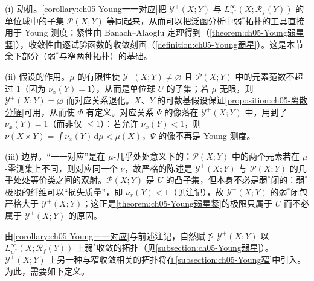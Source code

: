 \documentclass[../../main.tex]{subfiles}%
\begin{document}
\begin{remark}\label{remark:ch05-Young一一对应动机}
(i) 动机。\cref{corollary:ch05-Young一一对应}把 $\mathcal{Y}^+(X;Y)$ 与 $L^\infty_{w^*}(X;\mathscr{R}_f(Y))$ 的单位球中的子集 $\mathcal{P}(X;Y)$ 等同起来，从而可以把泛函分析中弱$^*$拓扑的工具直接用于 Young 测度：紧性由 Banach--Alaoglu 定理得到（\cref{theorem:ch05-Young弱星紧}），收敛性由逐试验函数的收敛刻画（\cref{definition:ch05-Young弱星}）。这是本节余下部分（弱$^*$与窄两种拓扑）的基础。

(ii) 假设的作用。$\mu$ 的有限性使 $\mathcal{Y}^+(X;Y)\neq\varnothing$ 且 $\mathcal{P}(X;Y)$ 中的元素范数不超过 $1$（因为 $\nu_x(Y)=1$），从而是单位球 $U$ 的子集；若 $\mu$ 无限，则 $\mathcal{Y}^+(X;Y)=\varnothing$ 而对应关系退化。$X$、$Y$ 的可数基假设保证\cref{proposition:ch05-离散分解}可用，从而使 $\Phi$ 有定义。对应关系 $\Psi$ 的像落在 $\mathcal{Y}^+(X;Y)$ 中，用到了 $\nu_x(Y)=1$（而非仅 $\leqslant1$）：若允许 $\nu_x(Y)<1$，则 $\nu(X\times Y)=\int\nu_x(Y)\,\mathrm{d}\mu<\mu(X)$，$\Psi$ 的像不再是 Young 测度。

(iii) 边界。“一一对应”是在 $\mu$-几乎处处意义下的：$\mathcal{P}(X;Y)$ 中的两个元素若在 $\mu$-零测集上不同，则对应同一个 $\nu$，故严格的陈述是 $\mathcal{Y}^+(X;Y)$ 与 $\mathcal{P}(X;Y)$ 的几乎处处等价类之间的双射。$\mathcal{P}(X;Y)$ 是 $U$ 的凸子集，但本身不必是弱$^*$闭的：弱$^*$极限的纤维可以“损失质量”，即 $\nu_x(Y)<1$（见\hyperref[remark:ch05-弱星损失质量]{注记}），故 $\mathcal{Y}^+(X;Y)$ 的弱$^*$闭包严格大于 $\mathcal{Y}^+(X;Y)$；这正是\cref{theorem:ch05-Young弱星紧}的极限只属于 $U$ 而不必属于 $\mathcal{Y}^+(X;Y)$ 的原因。
\end{remark}

由\cref{corollary:ch05-Young一一对应}与前述注记，自然赋予 $\mathcal{Y}^+(X;Y)$ 以 $L^\infty_{w^*}(X;\mathscr{R}_f(Y))$ 上弱$^*$收敛的拓扑（见\cref{subsection:ch05-Young弱星}）。$\mathcal{Y}^+(X;Y)$ 上另一种与窄收敛相关的拓扑将在\cref{subsection:ch05-Young窄}中引入。为此，需要如下定义。
\end{document}
